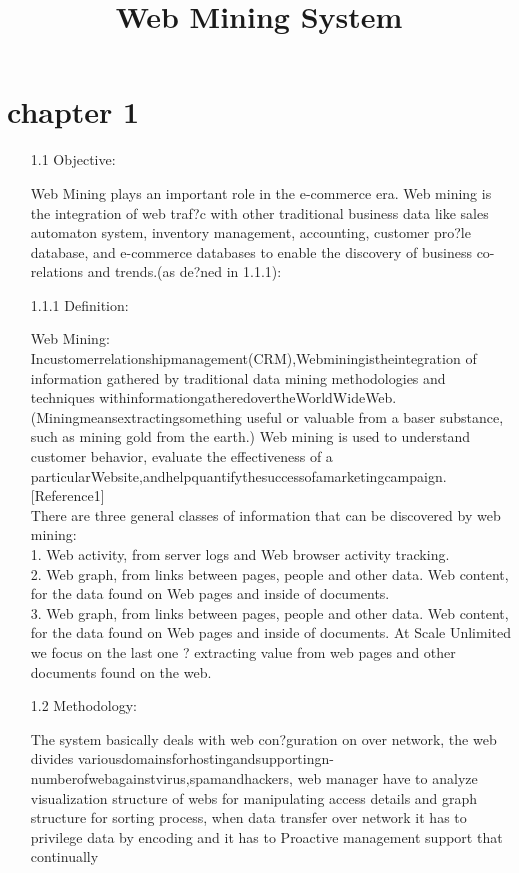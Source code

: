 \documentclass[a4paper,10pt]{article}
\begin{document}
\section{chapter 1}
\title{\textbf{Web Mining System}}
\maketitle
\begin{enumerate}
	\item[1.1] Objective:
	\begin{center}
		Web Mining plays an important role in the e-commerce era. Web mining is the integration of web traf?c with other traditional business data like sales automaton system, inventory management, accounting, customer pro?le database, and e-commerce databases to enable the discovery of business co-relations and trends.(as de?ned in 1.1.1):
	\end{center}
\item[1.1.1] Definition:
\begin{center}
	Web Mining: Incustomerrelationshipmanagement(CRM),Webminingistheintegration of information gathered by traditional data mining methodologies and techniques withinformationgatheredovertheWorldWideWeb. (Miningmeansextractingsomething useful or valuable from a baser substance, such as mining gold from the earth.) Web mining is used to understand customer behavior, evaluate the effectiveness of a particularWebsite,andhelpquantifythesuccessofamarketingcampaign.[Reference1]\\
	There are three general classes of information that can be discovered by web mining\vspace{0.5cm}:\\
	1. Web activity, from server logs and Web browser activity tracking.\\ 2. Web graph, from links between pages, people and other data. Web content, for the data found on Web pages and inside of documents.\\ 3. Web graph, from links between pages, people and other data. Web content, for the data found on Web pages and inside of documents.
	At Scale Unlimited we focus on the last one ? extracting value from web pages and other documents found on the web.
	
\end{center}
\item[1.2] Methodology:
\begin{center}
	The system basically deals with web con?guration on over network, the web divides variousdomainsforhostingandsupportingn-numberofwebagainstvirus,spamandhackers, web manager have to analyze visualization structure of webs for manipulating access details and graph structure for sorting process, when data transfer over network it has to privilege data by encoding and it has to Proactive management support that continually
\end{center}
\end{enumerate}
\end{document}
